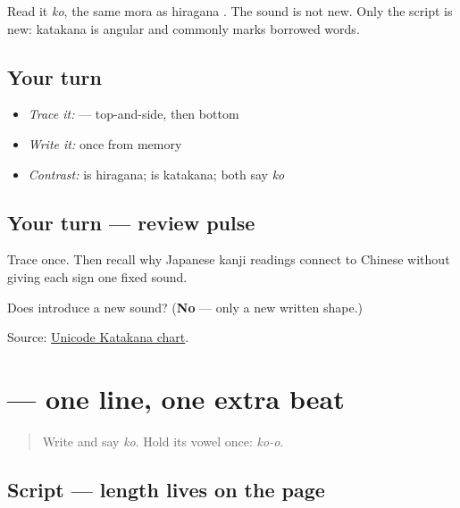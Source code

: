 Read it \emph{ko}, the same mora as hiragana . The sound is not new. Only the script is new: katakana is angular and commonly marks borrowed words.

\subsection*{Your turn}
\begin{itemize}
\raggedright
  \item \emph{Trace it:}  — top-and-side, then bottom
  \item \emph{Write it:}  once from memory
  \item \emph{Contrast:}  is hiragana;  is katakana; both say \emph{ko}
\end{itemize}

\subsection*{Your turn — review pulse}
Trace \textbf{} once. Then recall why Japanese kanji readings connect to Chinese without giving each sign one fixed sound.

\begin{tcolorbox}[breakable,colback=teal!4,colframe=teal!35!black,title={Before you move on}]
Does  introduce a new sound? (\textbf{No} — only a new written shape.)

Source: \href{https://www.unicode.org/charts/PDF/U30A0.pdf}{Unicode Katakana chart}.
\end{tcolorbox}
\section[\texorpdfstring{\ja{ー} (chōonpu)}{ー (chōonpu)}]{ — one line, one extra beat}

\label{lesson:JA-W06-long-mark}



\begin{quote}
Write  and say \emph{ko}. Hold its vowel once: \emph{ko-o}.
\end{quote}

\subsection*{Script — length lives on the page}

